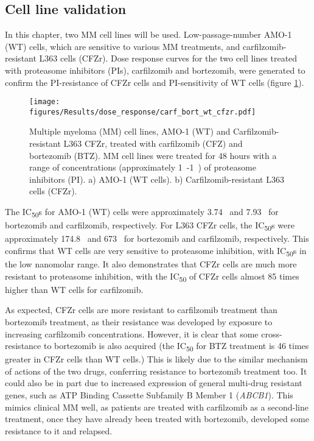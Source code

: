 \subsection{Cell line validation}
In this chapter, two MM cell lines will be used.
Low-passage-number AMO-1 (WT) cells, which are sensitive to various MM treatments, and carfilzomib-resistant L363 cells (CFZr).
Dose response curves for the two cell lines treated with proteasome inhibitors (PIs), carfilzomib and bortezomib, were generated to confirm the PI-resistance of CFZr cells and PI-sensitivity of WT cells (figure \ref{fig:dose_carf_bort}).
\begin{figure}[h]
\centering
\texttt{[image: figures/Results/dose\_response/carf\_bort\_wt\_cfzr.pdf]}
\caption[Carfilzomib and bortezomib dose response curves]{Multiple myeloma (MM) cell lines, AMO-1 (WT) and Carfilzomib-resistant L363 CFZr, treated with carfilzomib (CFZ) and bortezomib (BTZ).
MM cell lines were treated for 48 hours with a range of concentrations (approximately 1\si{\nano\Molar}-1\si{\micro\Molar}) of proteasome inhibitors (PI).
a) AMO-1 (WT cells).
b) Carfilzomib-resistant L363 cells (CFZr).}
\label{fig:dose_carf_bort}
\end{figure}
The IC\textsubscript{50}s for AMO-1 (WT) cells were approximately 3.74\si{\nano\Molar} and 7.93\si{\nano\Molar} for bortezomib and carfilzomib, respectively.
For L363 CFZr cells, the IC\textsubscript{50}s were approximately 174.8\si{\nano\Molar} and 673\si{\nano\Molar} for bortezomib and carfilzomib, respectively.
This confirms that WT cells are very sensitive to proteasome inhibition, with IC\textsubscript{50}s in the low nanomolar range.
It also demonstrates that CFZr cells are much more resistant to proteasome inhibition, with the IC\textsubscript{50} of CFZr cells almost 85 times higher than WT cells for carfilzomib.

As expected, CFZr cells are more resistant to carfilzomib treatment than bortezomib treatment, as their resistance was developed by exposure to increasing carfilzomib concentrations.
However, it is clear that some cross-resistance to bortezomib is also acquired (the IC\textsubscript{50} for BTZ treatment is 46 times greater in CFZr cells than WT cells.)
This is likely due to the similar mechanism of actions of the two drugs, conferring resistance to bortezomib treatment too.
It could also be in part due to increased expression of general multi-drug resistant genes, such as ATP Binding Cassette Subfamily B Member 1 (\textit{ABCB1}).
This mimics clinical MM well, as patients are treated with carfilzomib as a second-line treatment, once they have already been treated with bortezomib, developed some resistance to it and relapsed.

